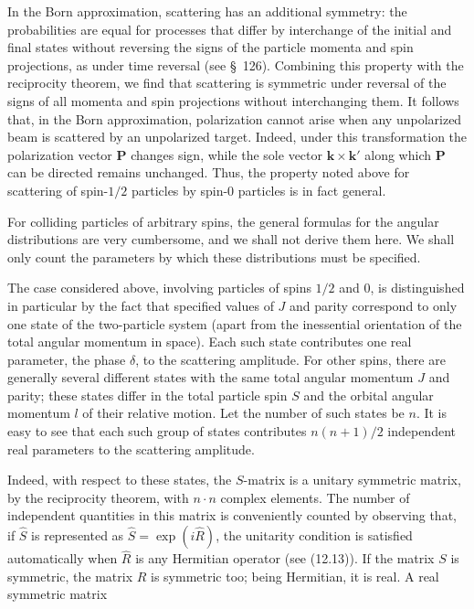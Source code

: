 In the Born approximation, scattering has an additional symmetry: the probabilities are equal for processes that differ by interchange of the initial and final states without reversing the signs of the particle momenta and spin projections, as under time reversal (see \S~126). Combining this property with the reciprocity theorem, we find that scattering is symmetric under reversal of the signs of all momenta and spin projections without interchanging them. It follows that, in the Born approximation, polarization cannot arise when any unpolarized beam is scattered by an unpolarized target. Indeed, under this transformation the polarization vector $\mathbf P$ changes sign, while the sole vector $\mathbf k\times\mathbf k'$ along which $\mathbf P$ can be directed remains unchanged. Thus, the property noted above for scattering of spin-$1/2$ particles by spin-0 particles is in fact general.

For colliding particles of arbitrary spins, the general formulas for the angular distributions are very cumbersome, and we shall not derive them here. We shall only count the parameters by which these distributions must be specified.

The case considered above, involving particles of spins $1/2$ and 0, is distinguished in particular by the fact that specified values of $J$ and parity correspond to only one state of the two-particle system (apart from the inessential orientation of the total angular momentum in space). Each such state contributes one real parameter, the phase $\delta$, to the scattering amplitude. For other spins, there are generally several different states with the same total angular momentum $J$ and parity; these states differ in the total particle spin $S$ and the orbital angular momentum $l$ of their relative motion. Let the number of such states be $n$. It is easy to see that each such group of states contributes $n(n+1)/2$ independent real parameters to the scattering amplitude.

Indeed, with respect to these states, the $S$-matrix is a unitary symmetric matrix, by the reciprocity theorem, with $n\cdot n$ complex elements. The number of independent quantities in this matrix is conveniently counted by observing that, if $\hat S$ is represented as $\hat S=\exp(i\hat R)$, the unitarity condition is satisfied automatically when $\hat R$ is any Hermitian operator (see (12.13)). If the matrix $S$ is symmetric, the matrix $R$ is symmetric too; being Hermitian, it is real. A real symmetric matrix

